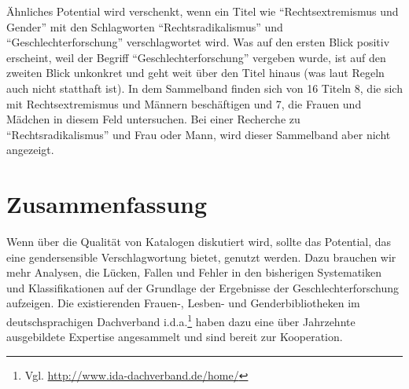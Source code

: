 \documentclass[a4paper,
fontsize=11pt,
oneside,
numbers=noperiodatend,
parskip=half-,
bibliography=totoc,
final
]{scrartcl}
\begin{document}
Ähnliches Potential wird verschenkt, wenn ein Titel wie
\enquote{Rechtsextremismus und Gender} mit den Schlagworten
\enquote{Rechtsradikalismus} und \enquote{Geschlechterforschung}
verschlagwortet wird. Was auf den ersten Blick positiv erscheint, weil
der Begriff \enquote{Geschlechterforschung} vergeben wurde, ist auf den
zweiten Blick unkonkret und geht weit über den Titel hinaus (was laut
Regeln auch nicht statthaft ist). In dem Sammelband finden sich von 16
Titeln 8, die sich mit Rechtsextremismus und Männern beschäftigen und 7,
die Frauen und Mädchen in diesem Feld untersuchen. Bei einer Recherche
zu \enquote{Rechtsradikalismus} und Frau oder Mann, wird dieser
Sammelband aber nicht angezeigt.

\section*{Zusammenfassung}\label{zusammenfassung}

Wenn über die Qualität von Katalogen diskutiert wird, sollte das
Potential, das eine gendersensible Verschlagwortung bietet, genutzt
werden. Dazu brauchen wir mehr Analysen, die Lücken, Fallen und Fehler
in den bisherigen Systematiken und Klassifikationen auf der Grundlage
der Ergebnisse der Geschlechterforschung aufzeigen. Die existierenden
Frauen-, Lesben- und Genderbibliotheken im deutschsprachigen Dachverband
i.d.a.\footnote{Vgl. \url{http://www.ida-dachverband.de/home/}} haben
dazu eine über Jahrzehnte ausgebildete Expertise angesammelt und sind
bereit zur Kooperation.

\end{document}
